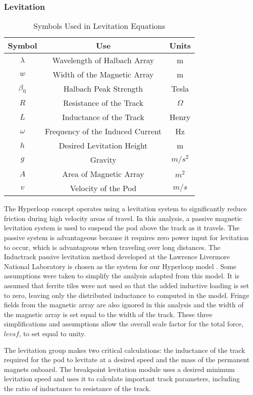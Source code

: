 \subsubsection{Levitation}
	\begin{table}[ht]
	\caption{Symbols Used in Levitation Equations}
	\centering
	\begin{tabular}{c c c}
	\hline\hline
	Symbol & Use & Units\\ [0.5ex]
	\hline
	$\lambda$ & Wavelength of Halbach Array & m\\
	$w$ & Width of the Magnetic Array & m\\
	$\beta _{0}$ & Halbach Peak Strength & Tesla\\
	$R$ & Resistance of the Track & $\Omega$\\
	$L$ & Inductance of the Track & Henry\\
	$\omega$ & Frequency of the Induced Current & Hz\\
	$h$ & Desired Levitation Height & m\\
	$g$ & Gravity & $m/s^{2}$\\
	$A$ & Area of Magnetic Array & $m^{2}$\\
	$v$ & Velocity of the Pod & $m/s$\\ [1ex]
	\hline
	\end{tabular}
	\label{table:nonlin}
	\end{table}
	The Hyperloop concept operates using a levitation system to significantly reduce friction during high velocity areas of travel. In this analysis, a passive magnetic levitation system is used to suspend the pod above the track as it travels. The passive system is advantageous because it requires zero power input for levitation to occur, which is advantageous when traveling over long distances. The Inductrack passive levitation method developed at the Lawrence Livermore National Laboratory is chosen as the system for our Hyperloop model \cite{inductrack}. Some assumptions were taken to simplify the analysis adapted from this model. It is assumed that ferrite tiles were not used so that the added inductive loading is set to zero, leaving only the distributed inductance to computed in the model. Fringe fields from the magnetic array are also ignored in this analysis and the width of the magnetic array is set equal to the width of the track. These three simplifications and assumptions allow the overall scale factor for the total force, $levsf$, to set equal to unity.

	The levitation group makes two critical calculations: the inductance of the track required for the pod to levitate at a desired speed and the mass of the permanent magnets onboard. The breakpoint levitation module uses a desired minimum levitation speed and uses it to calculate important track parameters, including the ratio of inductance to resistance of the track.


